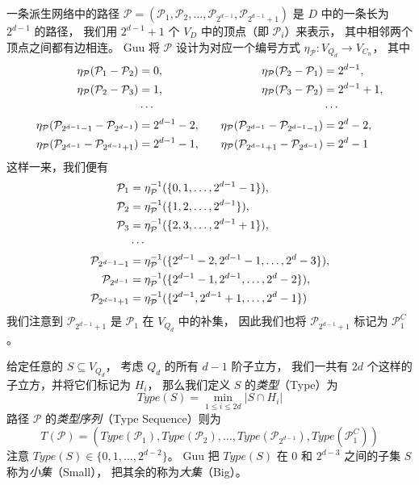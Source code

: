 一条派生网络中的路径
$\mathcal{P} = (\mathcal{P}_1, \mathcal{P}_2, \dots, \mathcal{P}_{2^{d - 1}}, \mathcal{P}_{2^{d - 1} + 1})$
是 $D$ 中的一条长为 $2^{d - 1}$ 的路径，
我们用 $2^{d - 1} + 1$ 个 $V_D$ 中的顶点（即 $\mathcal{P}_i$）来表示，
其中相邻两个顶点之间都有边相连。
Guu 将 $\mathcal{P}$ 设计为对应一个编号方式 $\eta_\mathcal{P} \colon V_{Q_d} \rightarrow V_{C_n}$，
其中
\begin{align}
\eta_\mathcal{P}(\mathcal{P}_1 - \mathcal{P}_2) & = 0, & \quad
\eta_\mathcal{P}(\mathcal{P}_2 - \mathcal{P}_1) & = 2^{d - 1}, \\
\eta_\mathcal{P}(\mathcal{P}_2 - \mathcal{P}_3) & = 1, & \quad
\eta_\mathcal{P}(\mathcal{P}_3 - \mathcal{P}_2) & = 2^{d - 1} + 1, \\
						& \cdots & \quad & \cdots \notag \\
\eta_\mathcal{P}(\mathcal{P}_{2^{d - 1} - 1} - \mathcal{P}_{2^{d - 1}}) & = 2^{d - 1} - 2, & \quad
\eta_\mathcal{P}(\mathcal{P}_{2^{d - 1}} - \mathcal{P}_{2^{d - 1} - 1}) & = 2^d - 2, \\
\eta_\mathcal{P}(\mathcal{P}_{2^{d - 1}} - \mathcal{P}_{2^{d - 1} + 1}) & = 2^{d - 1} - 1, & \quad
\eta_\mathcal{P}(\mathcal{P}_{2^{d - 1} + 1} - \mathcal{P}_{2^{d - 1}}) & = 2^d - 1
\end{align}
这样一来，我们便有
\begin{align}
	      \mathcal{P}_1 & = \eta_\mathcal{P}^{-1}(\{0, 1, \dots, 2^{d - 1} - 1\}), \\
	      \mathcal{P}_2 & = \eta_\mathcal{P}^{-1}(\{1, 2, \dots, 2^{d - 1}\}), \\
	      \mathcal{P}_3 & = \eta_\mathcal{P}^{-1}(\{2, 3, \dots, 2^{d - 1} + 1\}), \\
			    & \cdots \notag \\
\mathcal{P}_{2^{d - 1} - 1} & = \eta_\mathcal{P}^{-1}(\{2^{d - 1} - 2, 2^{d - 1} - 1, \dots, 2^d - 3\}), \\
    \mathcal{P}_{2^{d - 1}} & = \eta_\mathcal{P}^{-1}(\{2^{d - 1} - 1, 2^{d - 1}, \dots, 2^d - 2\}), \\
\mathcal{P}_{2^{d - 1} + 1} & = \eta_\mathcal{P}^{-1}(\{2^{d - 1}, 2^{d - 1} + 1, \dots, 2^d - 1\})
\end{align}
我们注意到 $\mathcal{P}_{2^{d - 1} + 1}$ 是 $\mathcal{P}_1$ 在 $V_{Q_d}$ 中的补集，
因此我们也将 $\mathcal{P}_{2^{d - 1} + 1}$ 标记为 $\mathcal{P}_1^C$。

给定任意的 $S \subseteq V_{Q_d}$，
考虑 $Q_d$ 的所有 $d - 1$ 阶子立方，
我们一共有 $2 d$ 个这样的子立方，并将它们标记为 $H_i$，
那么我们定义 $S$ 的\emph{类型}（Type）为
\begin{equation}
Type(S) = \min_{1 \le i \le 2 d} |S \cap H_i|
\end{equation}
路径 $\mathcal{P}$ 的\emph{类型序列}（Type Sequence）则为
\begin{equation}
T(\mathcal{P}) = \left(Type(\mathcal{P}_1), Type(\mathcal{P}_2), \dots, Type(\mathcal{P}_{2^{d - 1}}), Type(\mathcal{P}_1^C)\right)
\end{equation}
注意 $Type(S) \in \{0, 1, \dots, 2^{d - 2}\}$。
Guu 把 $Type(S)$ 在 $0$ 和 $2^{d - 3}$ 之间的子集 $S$ 称为\emph{小集}（Small），
把其余的称为\emph{大集}（Big）。

